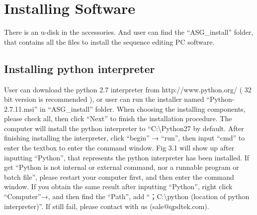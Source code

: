 \pagestyle{fancy}
\chapter{\heiti Installing Software}
\setmainfont{Times New Roman}
There is an u-disk in the accessories. And user can find the “ASG\_install” folder, that contains all the files to install the sequence editing PC software.

\section{\heiti Installing python interpreter}
User can download the python 2.7 interpreter from http://www.python.org/ ( 32 bit version is recommended ), or user can run the installer named “Python-2.7.11.msi” in “ASG\_install” folder. When choosing the installing components, please check all,  then click “Next” to finish the installation procedure. The computer will install the python interpreter to “C:\textbackslash Python27 by default. After finishing installing the interpreter, click “begin” → “run”, then input “cmd” to enter the textbox to enter the command window. Fig 3.1 will show up after inputting “Python”, that represents the python interpreter has been installed. If get “Python is not internal or external command, nor a runnable program or batch file”, please restart your computer first, and then enter the command window. If you obtain the same result after inputting “Python”, right click “Computer”→, and then find the “Path”, add “；C:\textbackslash python (location of python interpreter)”. If still fail, please contact with us (sale@qpdtek.com).

